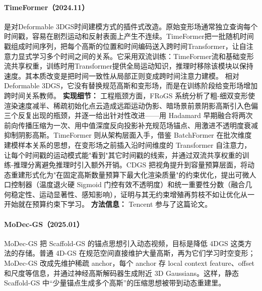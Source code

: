 \paragraph{TimeFormer（2024.11）\cite{2411_11941}}
是对Deformable 3DGS时间建模方式的插件式改造。原始变形场通常独立查询每个时间戳，容易在剧烈运动和反射表面上产生不连续。TimeFormer把一批随机时间戳组成时间序列，把每个高斯的位置和时间编码送入跨时间Transformer，让自注意力显式学习多个时间之间的关系。它采用双流训练：TimeFormer流和基础变形流共享权重，训练时用Transformer提供全局运动知识，推理时移除该模块以保持速度。其本质改变是把时间一致性从局部正则变成跨时间注意力建模。
相对Deformable 3DGS，它没有替换规范高斯和变形场，而是在训练阶段给变形场增加跨时间关系教师。
\textbf{实现细节：} 工程瓶颈方面，FRoGS 系统分析了粗-细双变形使渲染速度减半、稀疏初始化点云造成远距运动伪影、暗场景前景阴影高斯引入色偏三个反复出现的瓶颈，并逐一给出针对性改进——用 Hadamard 早期融合将两次前向传播压缩为一次、用中值深度反向投影补充规范场锚点、用激进不透明度衰减抑制阴影高斯。TimeFormer 则从架构层面入手，借鉴 BatchFormer 在批次维度建模样本关系的思想，在变形场之前插入沿时间维度的 Transformer 自注意力，让每个时间戳的运动模式能"看到"其它时间戳的线索，并通过双流共享权重的训练-推理分离避免推理时引入额外开销。CDGS 把视角提升到容量预算层面，将动态重建形式化为"在固定高斯数量预算下最大化渲染质量"的约束优化，提出可微人口控制器（温度退火硬 Sigmoid 门控有效不透明度）和统一重要性分数（融合几何稳定性、运动显著性、感知影响），证明与其无约束增殖再剪枝不如让优化从一开始就在预算约束下学习。
\textbf{方法信息：} Tencent 参与了这篇论文。



\paragraph{MoDec-GS（2025.01）\cite{2501_03714}}
MoDec-GS 把 Scaffold-GS 的锚点思想引入动态视频，目标是降低 4DGS 这类方法的存储。普通 4D-GS 在规范空间直接维护大量高斯，再为它们学习时空变形；MoDec-GS 改成先维护稀疏 anchor，每个 anchor 存 local context feature、offset 和尺度等信息，并通过神经高斯解码器生成附近 3D Gaussians。这样，静态 Scaffold-GS 中“少量锚点生成多个高斯”的压缩思想被带到动态重建里。

